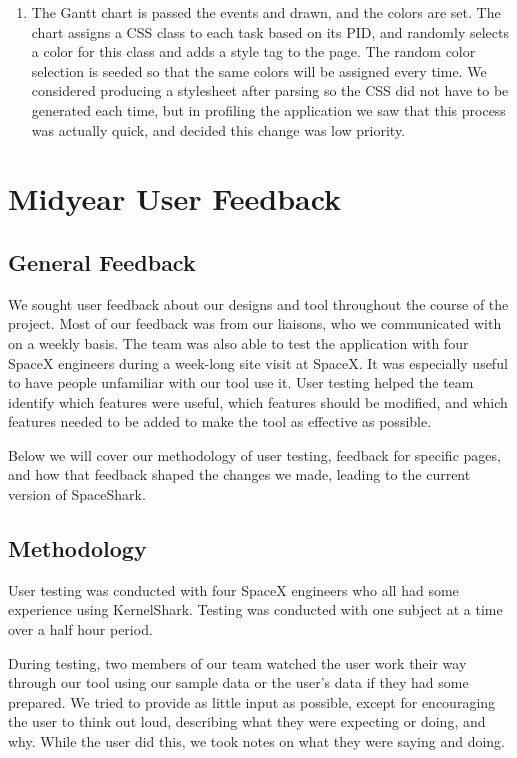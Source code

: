 \documentclass{hmcclinic}
\begin{document}
\begin{enumerate}
   \item The Gantt chart is passed the events and drawn, and the colors are set.
     The chart assigns a CSS class to each task based on its PID, and randomly
     selects a color for this class and adds a style tag to the page. The random
     color selection is seeded so that the same colors will be assigned every
     time. We considered producing a stylesheet after parsing so the CSS did not have
     to be generated each time, but in profiling the application we saw that
     this process was actually quick, and decided this change was low
     priority.

  \end{enumerate}


\chapter{Midyear User Feedback} %
\section{General Feedback} %
We sought user feedback about our designs and tool throughout the course of the
project. Most of our feedback was from our liaisons, who we communicated with on
a weekly basis. The team was also able to test the application with four SpaceX
engineers during a week-long site visit at SpaceX. It was especially useful to
have people unfamiliar with our tool use it.  User testing helped the team
identify which features were useful, which features should be modified, and
which features needed to be added to make the tool as effective as possible.

Below we will cover our methodology of user testing, feedback for specific
pages, and how that feedback shaped the changes we made, leading to the current
version of SpaceShark.

\section{Methodology} %
User testing was conducted with four SpaceX engineers who all had some
experience using KernelShark. Testing was conducted with one subject
at a time over a half hour period.

During testing, two members of our team watched the user work their way through
our tool using our sample data or the user's data if they had some prepared. We
tried to provide as little input as possible, except for encouraging the user
to think out loud, describing what they were expecting or doing, and why.
While the user did this, we took notes on what they were saying and doing.
\end{document}
